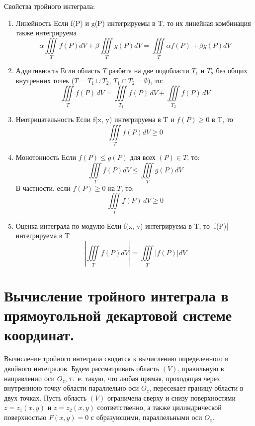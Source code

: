 \documentclass{article}
\begin{document}
Свойства тройного интеграла:
\begin{enumerate}
\item Линейность
  Если f(P) и g(P) интегрируемы в T, то их линейная комбинация также интегрируема
  \begin{equation}
    \alpha \iiint\limits_T f(P) dV + \beta \iiint\limits_T g(P) dV = \iiint\limits_T \alpha f(P) + \beta g(P) dV
  \end{equation}
\item Аддитивность
  Если область $T$ разбита на две подобласти $T_1$ и $T_2$ без общих внутренних точек
  ($T = T_1 \cup T_2$, $T_1 \cap T_2 = \emptyset$), то:
  \begin{equation}
    \iiint\limits_T f(P) \, dV =
    \iiint\limits_{T_1} f(P) \, dV +
    \iiint\limits_{T_2} f(P) \, dV
  \end{equation}
\item Неотрицательность
  Если f(x, y) интегрируема в T и $f(P) \geq 0$ в T, то
  \begin{equation}
    \iiint\limits_T f(P) dV \geq 0
  \end{equation}
\item Монотонность
  Если $f(P) \leq g(P)$ для всех $(P) \in T$, то:
  \begin{equation}
    \iiint\limits_T f(P) dV \leq \iiint\limits_T g(P) dV
  \end{equation}
  В частности, если $f(P) \geq 0$ на $T$, то:
  \begin{equation}
    \iiint\limits_T f(P) \, dV \geq 0
  \end{equation}
\item Оценка интеграла по модулю
  Если f(x, y) интегрируема в T, то |f(P)| интегрируема в T
  \begin{equation}
    |\iiint\limits_T f(P)dV|  = \iiint\limits_T |f(P)| dV
  \end{equation}
\end{enumerate}
\section{Вычисление тройного интеграла в прямоугольной декартовой системе координат.}
Вычисление тройного интеграла сводится к вычислению определенного и двойного интегралов.
Будем рассматривать область $(V)$, правильную в направлении оси $O_z$, т.~е. такую, что любая прямая, проходящая через внутреннюю точку области параллельно оси $O_z$, пересекает границу области в двух точках. Пусть область $(V)$ ограничена сверху и снизу поверхностями $z = z_1(x, y)$ и $z = z_2(x, y)$ соответственно, а также цилиндрической поверхностью $F(x, y) = 0$ с образующими, параллельными оси $O_z$.
\end{document}
